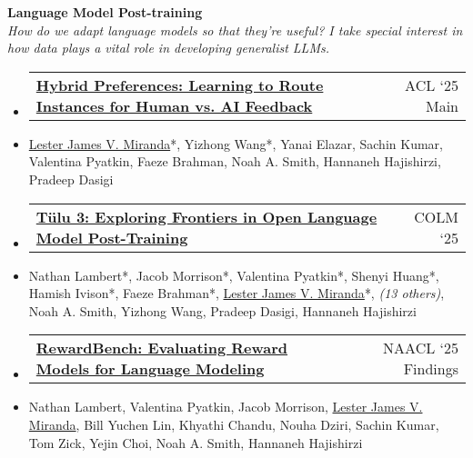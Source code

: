 \documentclass[a4paper,11pt]{article}
\makeatletter
\newcommand{\resumeItem}[1]{
  \item\small{
    {#1 \vspace{-2pt}}
  }
}
\newcommand{\resumeProjectHeading}[2]{
    \item
    \begin{tabular*}{0.97\textwidth}{l@{\extracolsep{\fill}}r}
      \small#1 & #2 \\
    \end{tabular*}\vspace{-7pt}
}
\newcommand{\resumeSubHeadingListStart}{\begin{itemize}[leftmargin=0.15in, label={}]}
\newcommand{\resumeSubHeadingListEnd}{\end{itemize}}
\makeatother
\begin{document}
\vspace{1em}
\textbf{Language Model Post-training}\\
\textit{How do we adapt language models so that they're useful? I take special interest in how data plays a vital role in developing generalist LLMs.}
\resumeSubHeadingListStart
\resumeProjectHeading
{\href{https://aclanthology.org/2025.acl-long.355/}{\textbf{Hybrid Preferences: Learning to Route Instances for Human vs. AI Feedback}}}{\small ACL `25 Main}
\resumeItem{\underline{Lester James V. Miranda}*, Yizhong Wang*, Yanai Elazar, Sachin Kumar, Valentina Pyatkin, Faeze Brahman, Noah A. Smith, Hannaneh Hajishirzi, Pradeep Dasigi}
\resumeProjectHeading
{\href{https://arxiv.org/abs/2411.15124}{\textbf{T\"ulu 3: Exploring Frontiers in Open Language Model Post-Training}}}{\small COLM `25}
\resumeItem{Nathan Lambert*, Jacob Morrison*, Valentina Pyatkin*, Shenyi Huang*, Hamish Ivison*, Faeze Brahman*, \underline{Lester James V. Miranda}*, \textit{(13 others)}, Noah A. Smith, Yizhong Wang, Pradeep Dasigi, Hannaneh Hajishirzi}
\resumeProjectHeading
{\href{https://aclanthology.org/2025.findings-naacl.96/}{\textbf{RewardBench: Evaluating Reward Models for Language Modeling}}}{\small NAACL `25 Findings}
\resumeItem{Nathan Lambert, Valentina Pyatkin, Jacob Morrison, \underline{Lester James V. Miranda}, Bill Yuchen Lin, Khyathi Chandu, Nouha Dziri, Sachin Kumar, Tom Zick, Yejin Choi, Noah A. Smith, Hannaneh Hajishirzi}
\resumeSubHeadingListEnd
\end{document}
